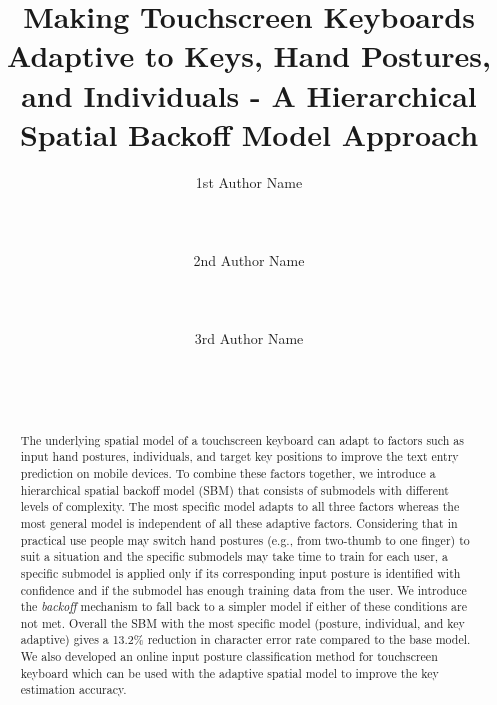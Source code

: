 \documentclass{sigchi}
\begin{document}
\title{Making Touchscreen Keyboards Adaptive to Keys, Hand Postures,  and Individuals - A Hierarchical Spatial Backoff Model Approach}

\author{
  \alignauthor 1st Author Name\\
    \\
    \\
    \\
  \alignauthor 2nd Author Name\\
    \\
    \\
    \\
  \alignauthor 3rd Author Name\\
    \\
    \\
    \\
}


\maketitle

\begin{abstract}
The underlying spatial model of a touchscreen keyboard can adapt to factors such as input hand postures, individuals, and target key positions to improve the text entry prediction on mobile devices. To 
combine these factors together, we introduce a hierarchical spatial backoff
model (SBM) that consists of submodels with different levels of
complexity. The most specific model adapts to 
all three factors whereas the most general model is independent
of all these adaptive factors. Considering that in practical use people may 
switch hand postures (e.g., from two-thumb to one finger) to suit a situation 
and the specific submodels may take time to train for each user,  a specific 
submodel is applied only if its corresponding input posture is identified with 
confidence and if the submodel has enough training data from the user.  We 
introduce the \textit{backoff} mechanism to fall back to a simpler model if 
either of these conditions are not met. Overall the SBM with the most specific 
model (posture, individual, and key adaptive) gives a 13.2\% reduction in 
character error rate compared to the base model. We also developed an online 
input posture classification method for touchscreen keyboard which can be used 
with the adaptive spatial model to improve the key estimation accuracy.
 
\end{abstract}
\end{document}
